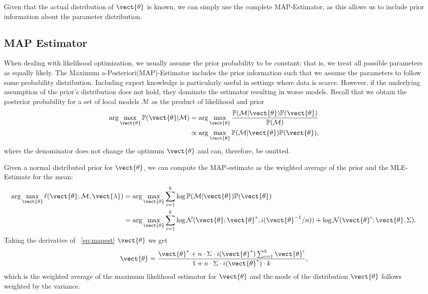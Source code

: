 Given that the actual distribution of $\vect{\theta}$ is known, we can simply use the complete MAP-Estimator, as this allows us to include prior information about the parameter distribution.

\subsection{MAP Estimator}
When dealing with likelihood optimization, we usually assume the prior probability to be constant; that is, we treat all possible parameters as equally likely.
The Maximum a-Posteriori(MAP)-Estimator includes the prior information such that we assume the parameters to follow some probability distribution.
Including expert knowledge is particularly useful in settings where data is scarce.
However, if the underlying assumption of the prior's distribution does not hold, they dominate the estimator resulting in worse models.
Recall that we obtain the posterior probability for a set of local models $\mathcal{M}$ as the product of likelihood and prior
\begin{equation}
    \begin{split}
    \arg\max_{\vect{\theta}}\mathbb{P}(\vect{\theta} \lvert \mathcal{M} ) &= \arg\max_{\vect{\theta}} \frac{\mathbb{P}(\mathcal{M}\lvert \vect{\theta}) \mathbb{P}(\vect{\theta}) }{\mathbb{P}(\mathcal{M})} \\
    &\propto  \arg\max_{\vect{\theta}}\mathbb{P}(\mathcal{M}\lvert \vect{\theta}) \mathbb{P}(\vect{\theta})  ,
    \end{split}
\end{equation}
where the denominator does not change the optimum \wrt $\vect{\theta}$ and can, therefore, be omitted.

Given a normal distributed prior for $\vect{\theta}$, we can  compute the MAP-estimate as the weighted average of the prior and the MLE-Estimate for the mean:
\begin{equation}
    \label{eq:mapest}
    \begin{split}
    \arg\max_{\vect{\theta}} \ell(\vect{\theta}; \mathcal{M}, \vect{\lambda}) &= \arg\max_{\vect{\theta}} \sum_{i=1}^k \log \mathbb{P}(\mathcal{M}\lvert \vect{\theta}) \mathbb{P}(\vect{\theta}) \\
    &= \arg\max_{\vect{\theta}} \sum_{i=1}^k   \log \mathcal{N}(\vect{\theta}; \vect{\theta}^*, i(\vect{\theta}^{-1}/n))+  \log \mathcal{N}(\vect{\theta}^i ; \vect{\theta}, \Sigma).
    \end{split}
\end{equation}
Taking the derivative of \eq~\ref{eq:mapest} \wrt $\vect{\theta}$ we get
\begin{equation}
    \vect{\theta} = \frac{\vect{\theta}^*  + n \cdot \Sigma \cdot i(\vect{\theta}^*) \sum_{i=1}^k \vect{\theta}^i}{1 + n \cdot \Sigma \cdot i(\vect{\theta}^*) \cdot k},
\end{equation}
which is the weighted average of the maximum likelihood estimator for $\vect{\theta}$ and the mode of the distribution $\vect{\theta}$ follows weighted by the variance.

